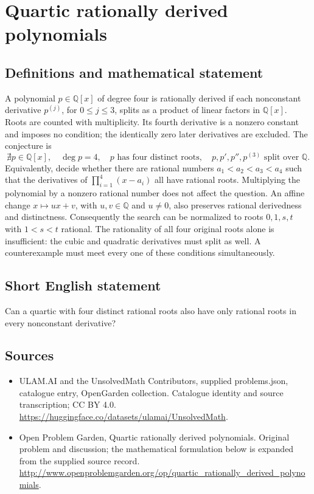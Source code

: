 \documentclass[11pt,a4paper]{article}
\begin{document}
\section*{Quartic rationally derived polynomials}\label{statement}

\subsection{Definitions and mathematical statement}
A polynomial $p\in\mathbb Q[x]$ of degree four is rationally derived if
each nonconstant derivative $p^{(j)}$, for $0\le j\le3$, splits as a
product of linear factors in $\mathbb Q[x]$. Roots are counted with
multiplicity. Its fourth derivative is a nonzero constant and imposes
no condition; the identically zero later derivatives are excluded.
The conjecture is
\[
 \nexists p\in\mathbb Q[x],\quad \deg p=4,
 \quad p\text{ has four distinct roots},
 \quad p,p',p'',p^{(3)}\text{ split over }\mathbb Q.
\]
Equivalently, decide whether there are rational numbers
$a_1<a_2<a_3<a_4$ such that the derivatives of
$\prod_{i=1}^4(x-a_i)$ all have rational roots. Multiplying the
polynomial by a nonzero rational number does not affect the question.
An affine change $x\mapsto ux+v$, with $u,v\in\mathbb Q$ and $u\ne0$,
also preserves rational derivedness and distinctness. Consequently the
search can be normalized to roots $0,1,s,t$ with $1<s<t$ rational.
The rationality of all four original roots alone is insufficient:
the cubic and quadratic derivatives must split as well. A counterexample
must meet every one of these conditions simultaneously.
\subsection{Short English statement}
Can a quartic with four distinct rational roots also have only rational roots in every nonconstant derivative?
\subsection{Sources}
\begin{itemize}
\item[S1] ULAM.AI and the UnsolvedMath Contributors, supplied problems.json, catalogue entry, OpenGarden collection. Catalogue identity and source transcription; CC BY 4.0.
\url{https://huggingface.co/datasets/ulamai/UnsolvedMath}.
\item[S2] Open Problem Garden, Quartic rationally derived polynomials. Original problem and discussion; the mathematical formulation below is expanded from the supplied source record.
\url{http://www.openproblemgarden.org/op/quartic_rationally_derived_polynomials}.
\end{itemize}
\end{document}
